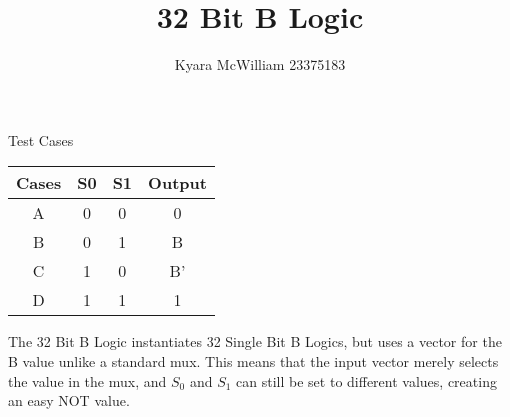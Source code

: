 \documentclass{article}
\title{32 Bit B Logic}
\author{Kyara McWilliam 23375183}
\date{}
\begin{document}
\maketitle

Test Cases
\hfill \break

\begin{tabular}{ |c|c|c|c| }
\hline
Cases & S0 & S1 & Output \\
\hline
A & 0 & 0 & 0 \\
B & 0 & 1 & B \\
C & 1 & 0 & B' \\
D & 1 & 1 & 1 \\
\hline
\end{tabular}
\hfill \break \break
The 32 Bit B Logic instantiates 32 Single Bit B Logics, but uses a vector for the B value unlike a standard mux. This means that the input vector merely selects the value in the mux, and $S_0$ and $S_1$ can still be set to different values, creating an easy NOT value.
\end{document}
